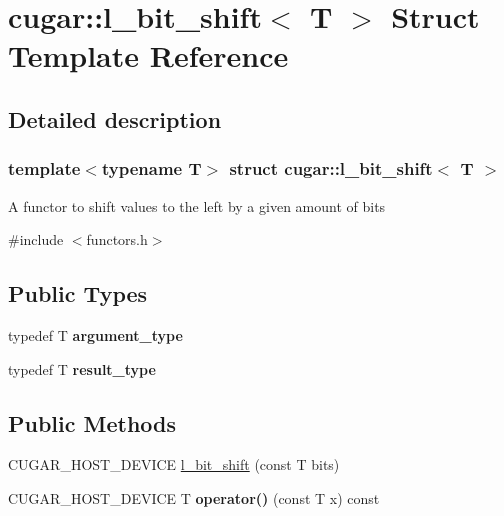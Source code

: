 \hypertarget{structcugar_1_1l__bit__shift}{}\section{cugar\+:\+:l\+\_\+bit\+\_\+shift$<$ T $>$ Struct Template Reference}
\label{structcugar_1_1l__bit__shift}


\subsection{Detailed description}
\subsubsection*{template$<$typename T$>$\newline
struct cugar\+::l\+\_\+bit\+\_\+shift$<$ T $>$}

A functor to shift values to the left by a given amount of bits 

{\ttfamily \#include $<$functors.\+h$>$}

\subsection*{Public Types}
\begin{DoxyCompactItemize}
\item 
\mbox{\label{structcugar_1_1l__bit__shift_a57c4595cbb92b1132cd67eaea77b41e3}} 
typedef T {\bfseries argument\+\_\+type}
\item 
\mbox{\label{structcugar_1_1l__bit__shift_aae6091a51d55f1b035a862be774c814d}} 
typedef T {\bfseries result\+\_\+type}
\end{DoxyCompactItemize}
\subsection*{Public Methods}
\begin{DoxyCompactItemize}
\item 
C\+U\+G\+A\+R\+\_\+\+H\+O\+S\+T\+\_\+\+D\+E\+V\+I\+CE \hyperlink{structcugar_1_1l__bit__shift_af5671df9afabf506684e4b7a5a928d7d}{l\+\_\+bit\+\_\+shift} (const T bits)
\item 
\mbox{\label{structcugar_1_1l__bit__shift_a194716020f0b1a8afd304063a6f95d39}} 
C\+U\+G\+A\+R\+\_\+\+H\+O\+S\+T\+\_\+\+D\+E\+V\+I\+CE T {\bfseries operator()} (const T x) const
\end{DoxyCompactItemize}


